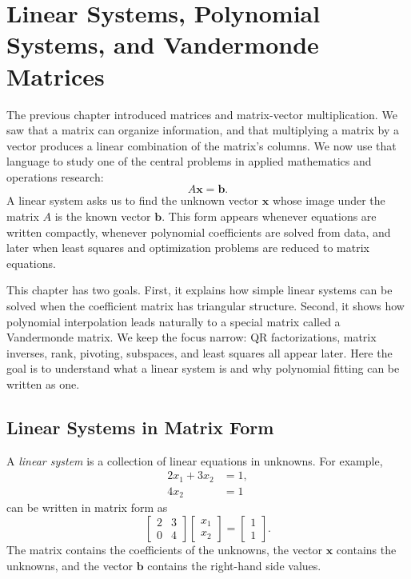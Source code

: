 
\chapter[Linear Systems and Vandermonde Matrices]{Linear Systems, Polynomial Systems, and Vandermonde Matrices}
\label{mf:ch08-linear-systems-vandermonde}
\label{mf:ch08-linear-systems-polynomial-vandermonde}

The previous chapter introduced matrices and matrix-vector multiplication. We saw that a matrix can organize information, and that multiplying a matrix by a vector produces a linear combination of the matrix's columns. We now use that language to study one of the central problems in applied mathematics and operations research:
\[
    A\mathbf{x}=\mathbf{b}.
\]
A linear system asks us to find the unknown vector \(\mathbf{x}\) whose image under the matrix \(A\) is the known vector \(\mathbf{b}\). This form appears whenever equations are written compactly, whenever polynomial coefficients are solved from data, and later when least squares and optimization problems are reduced to matrix equations.

This chapter has two goals. First, it explains how simple linear systems can be solved when the coefficient matrix has triangular structure. Second, it shows how polynomial interpolation leads naturally to a special matrix called a Vandermonde matrix. We keep the focus narrow: QR factorizations, matrix inverses, rank, pivoting, subspaces, and least squares all appear later. Here the goal is to understand what a linear system is and why polynomial fitting can be written as one.

\section{Linear Systems in Matrix Form}
\label{mf:linear-systems}

A \emph{linear system} is a collection of linear equations in unknowns. For example,
\[
    \begin{aligned}
        2x_1+3x_2 &= 1,\\
        4x_2 &= 1
    \end{aligned}
\]
can be written in matrix form as
\[
    \begin{bmatrix}
        2 & 3\\
        0 & 4
    \end{bmatrix}
    \begin{bmatrix}
        x_1\\ x_2
    \end{bmatrix}
    =
    \begin{bmatrix}
        1\\1
    \end{bmatrix}.
\]
The matrix contains the coefficients of the unknowns, the vector \(\mathbf{x}\) contains the unknowns, and the vector \(\mathbf{b}\) contains the right-hand side values.

